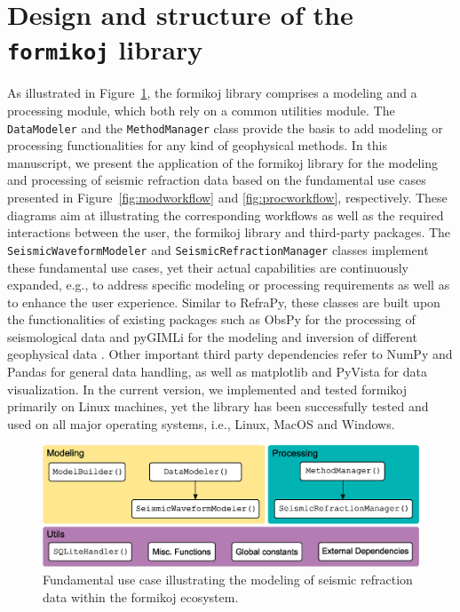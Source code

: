 \documentclass[a4paper,fleqn]{cas-sc}
\begin{document}
\section{Design and structure of the \texttt{formikoj} library}

As illustrated in Figure~\ref{fig:scheme}, the formikoj library comprises a modeling and a processing module, which both rely on a common utilities module. The \texttt{DataModeler} and the \texttt{MethodManager} class provide the basis to add modeling or processing functionalities for any kind of geophysical methods.
In this manuscript, we present the application of the formikoj library for the modeling and processing of seismic refraction data based on the fundamental use cases presented in Figure~\ref{fig:modworkflow} and \ref{fig:procworkflow}, respectively. These diagrams aim at illustrating the corresponding workflows as well as the required interactions between the user, the formikoj library and third-party packages. 
The \texttt{SeismicWaveformModeler} and \texttt{SeismicRefractionManager} classes implement these fundamental use cases, yet their actual capabilities are continuously expanded, e.g., to address specific modeling or processing requirements as well as to enhance the user experience.
Similar to RefraPy, these classes are built upon the functionalities of existing packages such as ObsPy for the processing of seismological data \citep[][]{beyreuther2010} and pyGIMLi for the modeling and inversion of different geophysical data \citep{ruecker2017}. Other important third party dependencies refer to NumPy \citep{harris2020} and Pandas \citep{mckinney2010} for general data handling, as well as matplotlib \citep{hunter2007} and PyVista \citep{sullivan2019} for data visualization. In the current version, we implemented and tested formikoj primarily on Linux machines, yet the library has been successfully tested and used on all major operating systems, i.e., Linux, MacOS and Windows.

\begin{figure}
	\centering
	\includegraphics[width=.75\textwidth]{figures/package_structure}
	\caption{Fundamental use case illustrating the modeling of seismic refraction data within the formikoj ecosystem.}
	\label{fig:scheme}
\end{figure}
\end{document}
